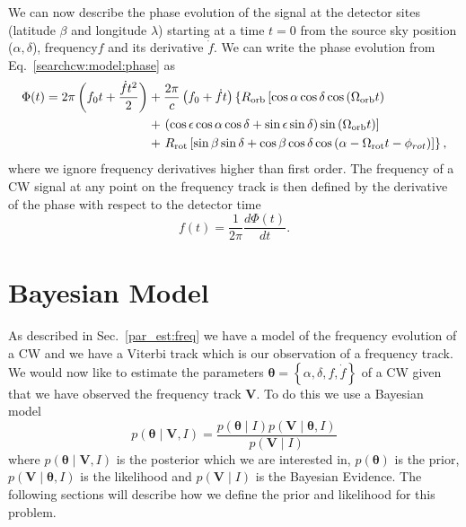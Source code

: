 We can now describe the phase evolution of the signal at the detector
sites (latitude $\beta$ and longitude $\lambda$) starting at a time $t=0$ from the source sky
position ($\alpha, \delta$), frequency$f$ and its derivative
$\dot{f}$.  We can write the phase evolution from Eq.~\ref{searchcw:model:phase} as
%
\begin{equation}
    \label{par_est:freq:ph_evolution}
    \begin{split}
        \Phi(t) = 2\pi \left(  f_0 t + \frac{\dot{f} t^2}{2} \right) &+ \frac{2\pi}{c} \left(  f_0 + \dot{f}t  \right) \left\{ R_{\rm{orb}} \left[ \cos \alpha \cos \delta \cos \left( \Omega_{\mathrm{orb}} t \right) \right. \right. \\ 
        &+ \left. \left( \cos \epsilon \cos \alpha \cos \delta +  \sin \epsilon \sin \delta \right) \sin \left( \Omega_{\mathrm{orb}} t  \right) \right] \\
        &+ \left. R_{\rm{rot}} \left[ \sin \beta \sin \delta + \cos \beta \cos \delta \cos \left( \alpha - \Omega_{\mathrm{rot}} t - \phi_{rot}  \right)     \right] \right\},
    \end{split}
\end{equation}
%
where we ignore frequency derivatives higher than first order.
The frequency of a \gls{CW} signal at any point on the frequency track is then defined by the derivative of
the phase with respect to the detector time
%
\begin{equation}
f(t) = \frac{1}{2\pi}\frac{d\Phi(t)}{dt}.
\end{equation}

%
%
\section{\label{par_est:bayes}Bayesian Model}
%
%

As described in Sec.~\ref{par_est:freq} we have a model of the frequency
evolution of a \gls{CW} and we have a Viterbi track which is our observation of
a frequency track.  We would now like to estimate the parameters $\bm{\theta} =
\left\{\alpha, \delta, f, \dot{f} \right\}$ of a \gls{CW} given that we have
observed the frequency track $\bm{V}$.  To do this we use a Bayesian model
%
\begin{equation}
    \label{par_est:bayes:eqn}
    p(\bm{\theta} \mid \bm{V}, I) = \frac{p(\bm{\theta} \mid I) p(\bm{V} \mid \bm{\theta}, I)}{p(\bm{V} \mid I)}
\end{equation}
%
where $p(\bm{\theta} \mid \bm{V}, I)$ is the posterior which we are interested in,
$p(\bm{\theta})$ is the prior, $p(\bm{V} \mid \bm{\theta}, I)$ is the
likelihood and $p(\bm{V} \mid I)$ is the Bayesian Evidence. The
following sections will describe how we define the prior and likelihood for
this problem.

